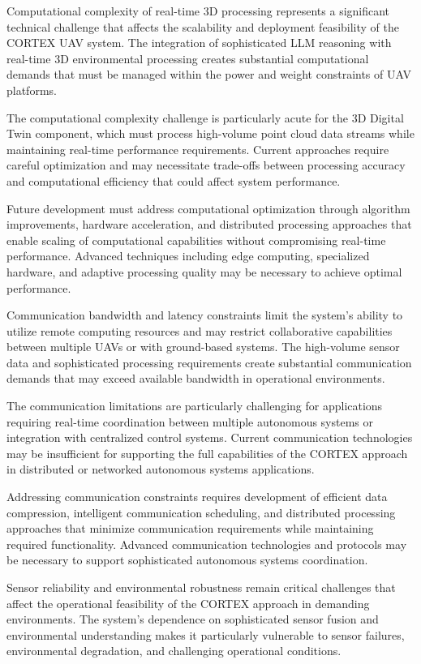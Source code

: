 Computational complexity of real-time 3D processing represents a significant technical challenge that affects the scalability and deployment feasibility of the CORTEX UAV system. The integration of sophisticated LLM reasoning with real-time 3D environmental processing creates substantial computational demands that must be managed within the power and weight constraints of UAV platforms.

The computational complexity challenge is particularly acute for the 3D Digital Twin component, which must process high-volume point cloud data streams while maintaining real-time performance requirements. Current approaches require careful optimization and may necessitate trade-offs between processing accuracy and computational efficiency that could affect system performance.

Future development must address computational optimization through algorithm improvements, hardware acceleration, and distributed processing approaches that enable scaling of computational capabilities without compromising real-time performance. Advanced techniques including edge computing, specialized hardware, and adaptive processing quality may be necessary to achieve optimal performance.

Communication bandwidth and latency constraints limit the system's ability to utilize remote computing resources and may restrict collaborative capabilities between multiple UAVs or with ground-based systems. The high-volume sensor data and sophisticated processing requirements create substantial communication demands that may exceed available bandwidth in operational environments.

The communication limitations are particularly challenging for applications requiring real-time coordination between multiple autonomous systems or integration with centralized control systems. Current communication technologies may be insufficient for supporting the full capabilities of the CORTEX approach in distributed or networked autonomous systems applications.

Addressing communication constraints requires development of efficient data compression, intelligent communication scheduling, and distributed processing approaches that minimize communication requirements while maintaining required functionality. Advanced communication technologies and protocols may be necessary to support sophisticated autonomous systems coordination.

Sensor reliability and environmental robustness remain critical challenges that affect the operational feasibility of the CORTEX approach in demanding environments. The system's dependence on sophisticated sensor fusion and environmental understanding makes it particularly vulnerable to sensor failures, environmental degradation, and challenging operational conditions.

